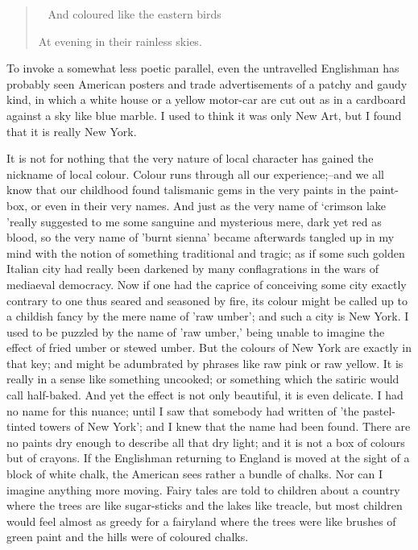 \documentclass{book}
\newenvironment{mdblockquote}{%
  \begin{quotation}
    \
}{%
  \end{quotation}
}
\begin{document}
\begin{mdblockquote}
	And coloured like the eastern birds

	At evening in their rainless skies.


\end{mdblockquote}
To invoke a somewhat less poetic parallel, even the untravelled Englishman has probably seen American posters and trade advertisements of a patchy and gaudy kind, in which a white house or a yellow motor-car are cut out as in a cardboard against a sky like blue marble. I used to think it was only New Art, but I found that it is really New York.

It is not for nothing that the very nature of local character has gained the nickname of local colour. Colour runs through all our experience;–and we all know that our childhood found talismanic gems in the very paints in the paint-box, or even in their very names. And just as the very name of ‘crimson lake ’really suggested to me some sanguine and mysterious mere, dark yet red as blood, so the very name of ’burnt sienna’ became afterwards tangled up in my mind with the notion of something traditional and tragic; as if some such golden Italian city had really been darkened by many conflagrations in the wars of mediaeval democracy. Now if one had the caprice of conceiving some city exactly contrary to one thus seared and seasoned by fire, its colour might be called up to a childish fancy by the mere name of ’raw umber’; and such a city is New York. I used to be puzzled by the name of ’raw umber,’ being unable to imagine the effect of fried umber or stewed umber. But the colours of New York are exactly in that key; and might be adumbrated by phrases like raw pink or raw yellow. It is really in a sense like something uncooked; or something which the satiric would call half-baked. And yet the effect is not only beautiful, it is even delicate. I had no name for this nuance; until I saw that somebody had written of ’the pastel-tinted towers of New York’; and I knew that the name had been found. There are no paints dry enough to describe all that dry light; and it is not a box of colours but of crayons. If the Englishman returning to England is moved at the sight of a block of white chalk, the American sees rather a bundle of chalks. Nor can I imagine anything more moving. Fairy tales are told to children about a country where the trees are like sugar-sticks and the lakes like treacle, but most children would feel almost as greedy for a fairyland where the trees were like brushes of green paint and the hills were of coloured chalks.
\end{document}
